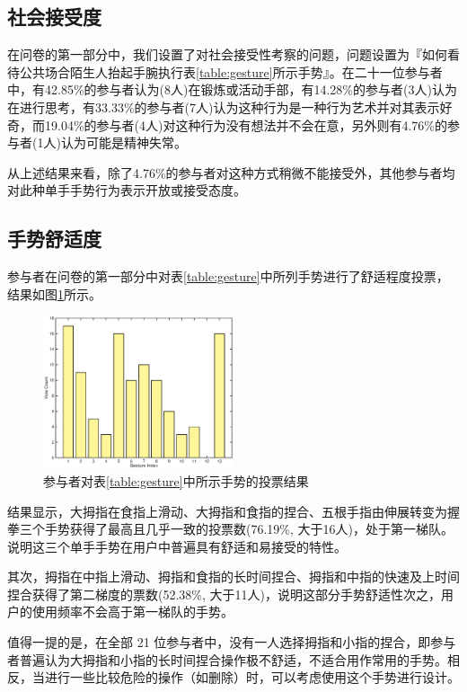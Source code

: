 \subsection{社会接受度}

在问卷的第一部分中，我们设置了对社会接受性考察的问题，问题设置为『如何看待公共场合陌生人抬起手腕执行表\ref{table:gesture}所示手势』。在二十一位参与者中，有42.85\%的参与者认为(8人)在锻炼或活动手部，有14.28\%的参与者(3人)认为在进行思考，有33.33\%的参与者(7人)认为这种行为是一种行为艺术并对其表示好奇，而19.04\%的参与者(4人)对这种行为没有想法并不会在意，另外则有4.76\%的参与者(1人)认为可能是精神失常。

从上述结果来看，除了4.76\%的参与者对这种方式稍微不能接受外，其他参与者均对此种单手手势行为表示开放或接受态度。

\subsection{手势舒适度}

参与者在问卷的第一部分中对表\ref{table:gesture}中所列手势进行了舒适程度投票，结果如图\ref{fig:gesture-vote}所示。

\begin{figure}[H]
    \kaishu
    \centering
    \includegraphics[width=0.5\textwidth]{figures/gesture-vote}
    \caption{\kaishu 参与者对表\ref{table:gesture}中所示手势的投票结果}
    \label{fig:gesture-vote}
\end{figure}

结果显示，大拇指在食指上滑动、大拇指和食指的捏合、五根手指由伸展转变为握拳三个手势获得了最高且几乎一致的投票数(76.19\%, 大于16人)，处于第一梯队。说明这三个单手手势在用户中普遍具有舒适和易接受的特性。

其次，拇指在中指上滑动、拇指和食指的长时间捏合、拇指和中指的快速及上时间捏合获得了第二梯度的票数(52.38\%, 大于11人)，说明这部分手势舒适性次之，用户的使用频率不会高于第一梯队的手势。

值得一提的是，在全部 21 位参与者中，没有一人选择拇指和小指的捏合，即参与者普遍认为大拇指和小指的长时间捏合操作极不舒适，不适合用作常用的手势。相反，当进行一些比较危险的操作（如删除）时，可以考虑使用这个手势进行设计。


